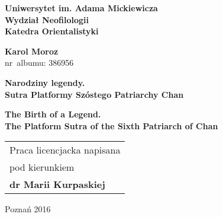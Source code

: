 \begin{titlepage}%
  \begin{center}%
    {\large \textbf{Uniwersytet im. Adama Mickiewicza\\ Wydział Neofilologii\\ Katedra Orientalistyki}\par}
    \par
  \end{center}%
   \vspace{1cm plus 1fill}
  \begin{flushleft}%
    {{\Large\bfseries Karol Moroz}\\
    nr~albumu: 386956\par}
  \end{flushleft}%
   \vspace{8mm plus 1mm minus 2mm}
  \begin{center}%
    {\huge\textbf{Narodziny legendy.\\Sutra Platformy Szóstego Patriarchy Chan}\par}
    \vspace{1em}
    {\Large\textbf{The Birth of a Legend.\\[3pt] The Platform Sutra of the Sixth Patriarch of Chan}}
    \vspace{2cm plus 1.5fill}
    \begin{flushright}\large
      \begin{tabular}{l}
        Praca licencjacka napisana\\[3pt]
        pod kierunkiem\\[3pt]
        \bfseries dr Marii Kurpaskiej
      \end{tabular}
    \end{flushright}
    \vspace{15mm plus .1fill}
    {\large Poznań 2016\par}
  \end{center}
\end{titlepage}%
